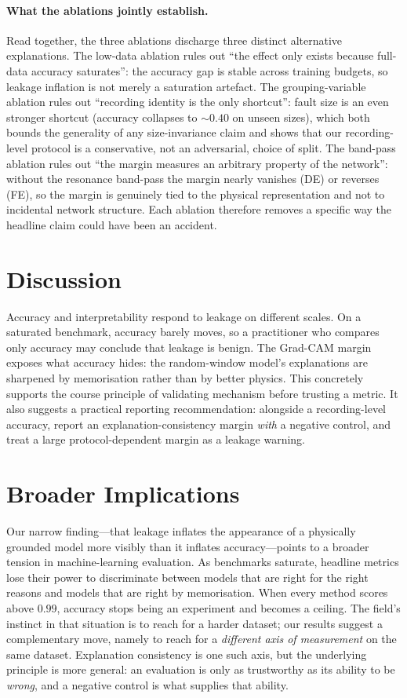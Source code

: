 \documentclass[11pt]{article}
\begin{document}
\paragraph{What the ablations jointly establish.}
Read together, the three ablations discharge three distinct alternative explanations. The
low-data ablation rules out ``the effect only exists because full-data accuracy
saturates'': the accuracy gap is stable across training budgets, so leakage inflation is
not merely a saturation artefact. The grouping-variable ablation rules out ``recording
identity is the only shortcut'': fault size is an even stronger shortcut (accuracy
collapses to $\sim0.40$ on unseen sizes), which both bounds the generality of any
size-invariance claim and shows that our recording-level protocol is a conservative, not an
adversarial, choice of split. The band-pass ablation rules out ``the margin measures an
arbitrary property of the network'': without the resonance band-pass the margin nearly
vanishes (DE) or reverses (FE), so the margin is genuinely tied to the physical
representation and not to incidental network structure. Each ablation therefore removes a
specific way the headline claim could have been an accident.

\section{Discussion}
Accuracy and interpretability respond to leakage on different scales. On a saturated
benchmark, accuracy barely moves, so a practitioner who compares only accuracy may
conclude that leakage is benign. The Grad-CAM margin exposes what accuracy hides: the
random-window model's explanations are sharpened by memorisation rather than by better
physics. This concretely supports the course principle of validating mechanism before
trusting a metric. It also suggests a practical reporting recommendation: alongside a
recording-level accuracy, report an explanation-consistency margin \emph{with} a negative
control, and treat a large protocol-dependent margin as a leakage warning.

\section{Broader Implications}
Our narrow finding---that leakage inflates the appearance of a physically grounded model
more visibly than it inflates accuracy---points to a broader tension in machine-learning
evaluation. As benchmarks saturate, headline metrics lose their power to discriminate
between models that are right for the right reasons and models that are right by
memorisation. When every method scores above $0.99$, accuracy stops being an experiment and
becomes a ceiling. The field's instinct in that situation is to reach for a harder dataset;
our results suggest a complementary move, namely to reach for a \emph{different axis of
measurement} on the same dataset. Explanation consistency is one such axis, but the
underlying principle is more general: an evaluation is only as trustworthy as its ability
to be \emph{wrong}, and a negative control is what supplies that ability.
\end{document}
